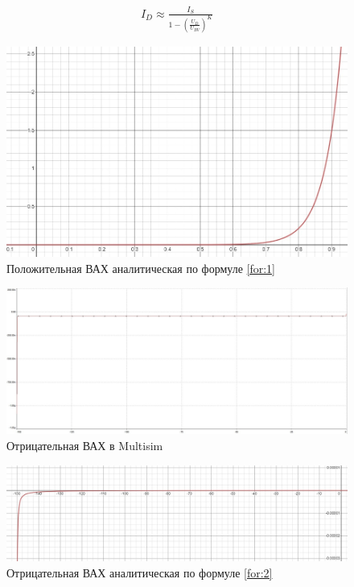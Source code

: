 \documentclass{labreport}
\begin{document}
\begin{gather}
    I_D \approx \frac{I_S}{1-\left( \frac{U_D}{U_{BV}} \right)^K}
    \label{for:2}
\end{gather}
\begin{figure}[h]
    \centering
    \includegraphics[width=\linewidth]{ek_graph_pos_a.jpg}
    \caption{Положительная ВАХ аналитическая по формуле \ref{for:1}}
\end{figure}




\begin{figure}[h]
    \centering
    \includegraphics[width=\linewidth]{ek_graph_neg_m.jpg}
    \caption{Отрицательная ВАХ в Multisim}
\end{figure}

\begin{figure}[h]
    \centering
    \includegraphics[width=\linewidth]{ek_graph_neg_a.jpg}
    \caption{Отрицательная ВАХ аналитическая по формуле \ref{for:2}}
\end{figure}
\end{document}
